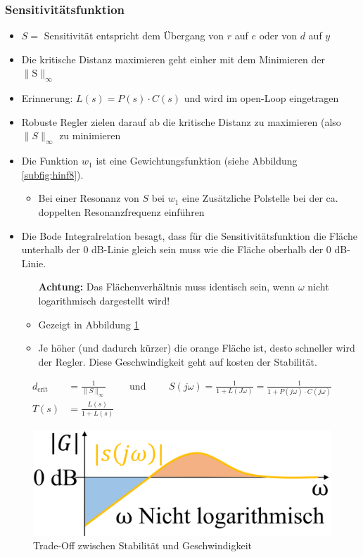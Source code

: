 \subsubsection{Sensitivitätsfunktion}
\begin{itemize}
	\item $S=$ Sensitivität entspricht dem Übergang von $r$ auf $e$ oder von $d$ auf $y$
	\item Die kritische Distanz maximieren geht einher mit dem Minimieren der $\lVert\text{S}\rVert_\infty$
	\item Erinnerung: $L(s) = P(s)\cdot C(s)$ und wird im open-Loop eingetragen
	\item Robuste Regler zielen darauf ab die kritische Distanz zu maximieren (also $\lVert S \rVert_\infty$ zu minimieren
	\item Die Funktion $w_1$ ist eine Gewichtungsfunktion (siehe Abbildung \ref{subfig:hinf8}).
	\begin{itemize}
		\item Bei einer Resonanz von $S$ bei $w_1$ eine Zusätzliche Polstelle bei der ca. doppelten Resonanzfrequenz einführen
	\end{itemize}
	\item Die Bode Integralrelation besagt, dass für die Sensitivitätsfunktion die Fläche unterhalb der 0 dB-Linie gleich sein muss wie die Fläche oberhalb der 0 dB-Linie. 
	\begin{itemize}
		\item [\textbf{Achtung:}] Das Flächenverhältnis muss identisch sein, wenn $\omega$ nicht logarithmisch dargestellt wird!
		\item Gezeigt in Abbildung \ref{fig:hinf10}
		\item Je höher (und dadurch kürzer) die orange Fläche ist, desto schneller wird der Regler. Diese Geschwindigkeit geht auf kosten der Stabilität.
	\end{itemize}
\end{itemize}
\begin{align*}
	d_\text{crit}&= \frac{1}{\lVert S \rVert_\infty} \qquad \text{ und } \qquad S(j\omega)=\frac{1}{1+L(J\omega)} = \frac{1}{1+P(j\omega)\cdot C(j\omega)}\\
	T(s) &= \frac{L(s)}{1+L(s)}
\end{align*}
\begin{figure}[!h]
	\centering
	\includegraphics[width=0.2\linewidth]{bilder/HInf10}
	\caption{Trade-Off zwischen Stabilität und Geschwindigkeit}
	\label{fig:hinf10}
\end{figure}

